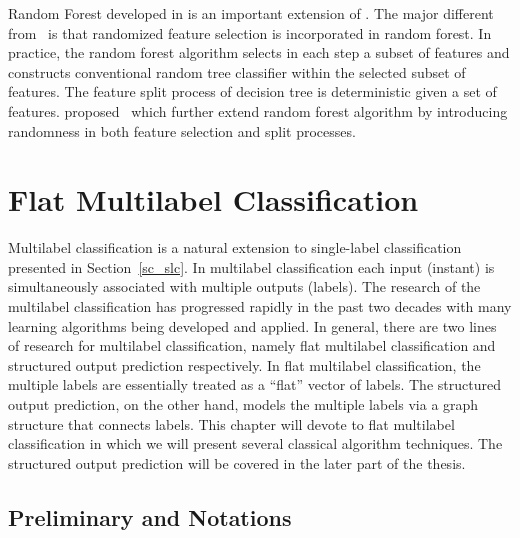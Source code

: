 {Random Forest developed in \citep{Breiman01random} is an important extension of \bagging.
The major different from \bagging\ is that randomized feature selection is incorporated in random forest.
In practice, the random forest algorithm selects in each step a subset of features and constructs conventional random tree classifier within the selected subset of features.
The feature split process of decision tree is deterministic given a set of features.
\citet{Liu08spectrum} proposed \vrtree\ which further extend random forest algorithm by introducing randomness in both feature selection and split processes.





%
%
\chapter{Flat Multilabel Classification} \label{ch_mlc}

Multilabel classification is a natural extension to single-label classification presented in Section~\ref{sc_slc}.
In multilabel classification each input (instant) is simultaneously associated with multiple outputs (labels).
The research of the multilabel classification has progressed rapidly in the past two decades with many learning algorithms being developed and applied.
In general, there are two lines of research for multilabel classification, namely flat multilabel classification and structured output prediction respectively.
In flat multilabel classification, the multiple labels are essentially treated as a ``flat'' vector of labels.
The structured output prediction, on the other hand, models the multiple labels via a graph structure that connects labels.
This chapter will devote to flat multilabel classification in which we will present several classical algorithm techniques.
The structured output prediction will be covered in the later part of the thesis.


\section{Preliminary and Notations} \label{sc_mlc_pn}

}
